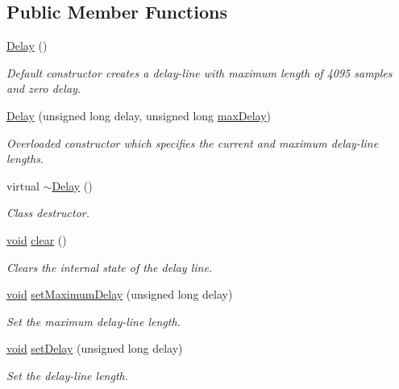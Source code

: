 \subsection*{Public Member Functions}
\begin{DoxyCompactItemize}
\item 
\hyperlink{class_nyq_1_1_delay_a6584fd4f8d46f71b09756b4156995e16}{Delay} ()
\begin{DoxyCompactList}\small\item\em Default constructor creates a delay-\/line with maximum length of 4095 samples and zero delay. \end{DoxyCompactList}\item 
\hyperlink{class_nyq_1_1_delay_a698fa0a89b3338841e899b71705e3475}{Delay} (unsigned long delay, unsigned long \hyperlink{_pit_shift_8cpp_a1c8f8a7c16de309a72f07cddd0de0eb2}{max\+Delay})
\begin{DoxyCompactList}\small\item\em Overloaded constructor which specifies the current and maximum delay-\/line lengths. \end{DoxyCompactList}\item 
virtual \hyperlink{class_nyq_1_1_delay_afee934130955d45563a6c5baaaf052d2}{$\sim$\+Delay} ()
\begin{DoxyCompactList}\small\item\em Class destructor. \end{DoxyCompactList}\item 
\hyperlink{sound_8c_ae35f5844602719cf66324f4de2a658b3}{void} \hyperlink{class_nyq_1_1_delay_aaf915f5e3f9f5d1c1391459fb90a433f}{clear} ()
\begin{DoxyCompactList}\small\item\em Clears the internal state of the delay line. \end{DoxyCompactList}\item 
\hyperlink{sound_8c_ae35f5844602719cf66324f4de2a658b3}{void} \hyperlink{class_nyq_1_1_delay_a591284b1853fa7d08e243ae3867c79e3}{set\+Maximum\+Delay} (unsigned long delay)
\begin{DoxyCompactList}\small\item\em Set the maximum delay-\/line length. \end{DoxyCompactList}\item 
\hyperlink{sound_8c_ae35f5844602719cf66324f4de2a658b3}{void} \hyperlink{class_nyq_1_1_delay_aea33f497be1e3dff5352691f7bb7c76f}{set\+Delay} (unsigned long delay)
\begin{DoxyCompactList}\small\item\em Set the delay-\/line length. \end{DoxyCompactList}\item 

\end{DoxyCompactItemize}
